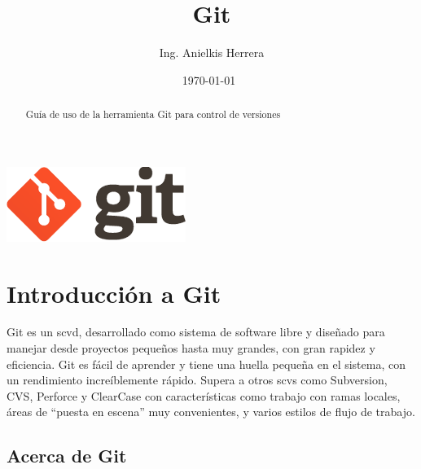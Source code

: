 \documentclass[12pt, spanish, oneside, onecolumn, a4paper]{report}
\makeatletter
\def\maketitle{%
  \null 
  \thispagestyle{empty}%
  \vfill 
  \begin{center}
    \leavevmode 
    \normalfont 
    \includegraphics{logo.png}%
    {\LARGE \@title\par}%
    \vskip 1cm {\Large \@author\par}%
    \vskip 1cm {\Large \@date\par}%
  \end{center}%
  \vfill 
  \null 
  \cleardoublepage
}
\makeatother
\begin{document}
 
\pagestyle{fancy} 

\title{ Git } 
\date{ 
  \today\ } 
\author{ Ing. Anielkis Herrera } 
\maketitle
\begin{abstract}
  Guía de uso de la herramienta Git para control de versiones 
\end{abstract} 
\newpage 
{} 
\chapter{Introducción a Git} 
\label{chap:intro} 




Git es un \gls{scvd}, desarrollado como sistema de software libre y diseñado para manejar desde proyectos pequeños hasta muy grandes, con gran rapidez y eficiencia. Git es fácil de aprender y tiene una huella pequeña en el sistema, con un rendimiento increíblemente rápido. Supera a otros \glspl{scv} como Subversion, CVS, Perforce y ClearCase con características como trabajo con ramas locales, áreas de ``puesta en escena'' muy convenientes, y varios estilos de flujo de trabajo. 

\section{Acerca de Git} 
\label{sec:aboutgit} 
\end{document}
